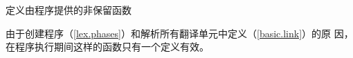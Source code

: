 定义由\cpp{}程序提供的非保留函数

\begin{note}[\noindent]
由于创建程序（\ref{lex.phases}）和解析所有翻译单元中定义（\ref{basic.link}）的原
因，在程序执行期间这样的函数只有一个定义有效。
\end{note}
